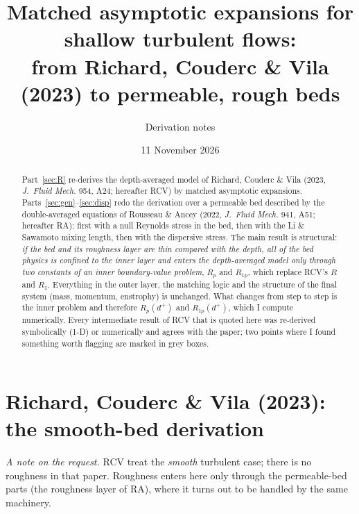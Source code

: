 \documentclass[10pt,a4paper]{article}
\title{Matched asymptotic expansions for shallow turbulent flows:\\
from Richard, Couderc \& Vila (2023) to permeable, rough beds}
\author{Derivation notes}
\date{11 November 2026}
\newcommand{\Rp}{R_p}
\newcommand{\Rop}{R_{1p}}
\begin{document}
\maketitle

\begin{abstract}
\noindent Part~\ref{sec:R} re-derives the depth-averaged model of Richard, Couderc \& Vila (2023, \emph{J.\ Fluid Mech.} 954, A24; hereafter RCV) by matched asymptotic expansions. Parts~\ref{sec:gen}--\ref{sec:disp} redo the derivation over a permeable bed described by the double-averaged equations of Rousseau \& Ancey (2022, \emph{J.\ Fluid Mech.} 941, A51; hereafter RA): first with a null Reynolds stress in the bed, then with the Li \& Sawamoto mixing length, then with the dispersive stress. The main result is structural: \emph{if the bed and its roughness layer are thin compared with the depth, all of the bed physics is confined to the inner layer and enters the depth-averaged model only through two constants of an inner boundary-value problem}, $\Rp$ and $\Rop$, which replace RCV's $R$ and $R_1$. Everything in the outer layer, the matching logic and the structure of the final system (mass, momentum, enstrophy) is unchanged. What changes from step to step is the inner problem and therefore $\Rp(d^+)$ and $\Rop(d^+)$, which I compute numerically. Every intermediate result of RCV that is quoted here was re-derived symbolically (1-D) or numerically and agrees with the paper; two points where I found something worth flagging are marked in grey boxes.
\end{abstract}

\tableofcontents

\section{Richard, Couderc \& Vila (2023): the smooth-bed derivation}\label{sec:R}
\emph{A note on the request.} RCV treat the \emph{smooth} turbulent case; there is no roughness in that paper. Roughness enters here only through the permeable-bed parts (the roughness layer of RA), where it turns out to be handled by the same machinery.
\end{document}
